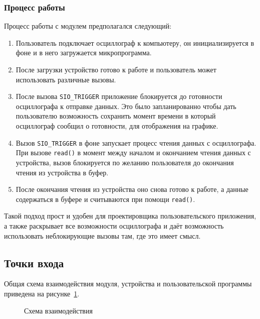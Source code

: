 \documentclass[a4paper,12pt]{report}
\numberwithin{equation}{section}
\begin{document}
\subsubsection{Процесс работы}
Процесс работы с модулем предполагался следующий:
\begin{enumerate}
\item Пользователь подключает осциллограф к компьютеру, он инициализируется в
  фоне и в него загружается микропрограмма.
\item После загрузки устройство готово к работе и пользователь может
  использовать различные вызовы.
\item После вызова \texttt{SIO\_TRIGGER} приложение блокируется до готовности
  осциллографа к отправке данных. Это было запланированно чтобы дать
  пользователю возможность сохранить момент времени в который осциллограф
  сообщил о готовности, для отображения на графике.
\item Вызов \texttt{SIO\_TRIGGER} в фоне запускает процесс чтения данных с
  осциллографа. При вызове \texttt{read()} в момент между началом и окончанием
  чтения данных с устройства, вызов блокируется по желанию пользователя до
  окончания чтения из устройства в буфер.
\item После окончания чтения из устройства оно снова готово к работе, а данные
  содержаться в буфере и считываются при помощи \texttt{read()}.
\end{enumerate}
Такой подход прост и удобен для проектировщика пользовательского приложения, а
также раскрывает все возможности осциллографа и даёт возможность использовать
неблокирующие вызовы там, где это имеет смысл.

\subsection{Точки входа}
Общая схема взаимодействия модуля, устройства и пользовательской программы
приведена на рисунке~\ref{interaction}.

\begin{figure}[h!]
\centering

\label{interaction}
\caption{Схема взаимодействия}
\end{figure}
\end{document}
